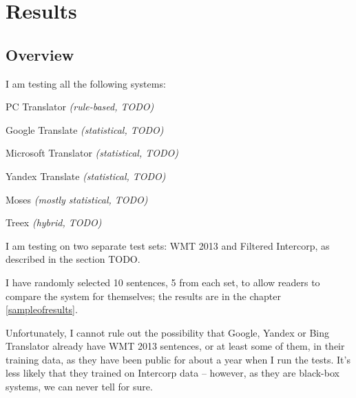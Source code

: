\chapter{Results}

\section{Overview}
\label{overvieweval}
I am testing all the following systems:
\begin{pitemize}
\item PC Translator \emph{(rule-based, TODO)}
\item Google Translate \emph{(statistical, TODO)}
\item Microsoft Translator \emph{(statistical, TODO)}
\item Yandex Translate \emph{(statistical, TODO)}
\item Moses \emph{(mostly statistical, TODO)}
\item Treex \emph{(hybrid, TODO)}
\end{pitemize}

I am testing on two separate test sets: WMT 2013 and Filtered Intercorp, as described in the section TODO.

I have randomly selected 10 sentences, 5 from each set, to allow readers to compare the system for themselves; the results are in the chapter \ref{sampleofresults}.

Unfortunately, I cannot rule out the possibility that Google, Yandex or Bing Translator already have WMT 2013 sentences, or at least some of them, in their training data, as they have been public for about a year when I run the tests. It's less likely that they trained on Intercorp data -- however, as they are black-box systems, we can never tell for sure.



